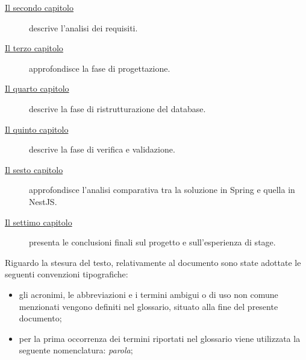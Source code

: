 \begin{description}
    \item[{\hyperref[cap:analisi-requisiti]{Il secondo capitolo}}] descrive l'analisi dei requisiti.
    
    \item[{\hyperref[cap:progettazione]{Il terzo capitolo}}] approfondisce la fase di progettazione.
    
    \item[{\hyperref[cap:ristrutturazione-database]{Il quarto capitolo}}] descrive la fase di ristrutturazione del database.
    
    \item[{\hyperref[cap:verifica-e-validazione]{Il quinto capitolo}}] descrive la fase di verifica e validazione.
    
    \item[{\hyperref[cap:analisi-comparativa]{Il sesto capitolo}}] approfondisce l'analisi comparativa tra la soluzione in Spring e quella in NestJS.
    
    \item[{\hyperref[cap:conclusioni]{Il settimo capitolo}}] presenta le conclusioni finali sul progetto e sull'esperienza di stage.
\end{description}

Riguardo la stesura del testo, relativamente al documento sono state adottate le seguenti convenzioni tipografiche:
\begin{itemize}
	\item gli acronimi, le abbreviazioni e i termini ambigui o di uso non comune menzionati vengono definiti nel glossario, situato alla fine del presente documento;
	\item per la prima occorrenza dei termini riportati nel glossario viene utilizzata la seguente nomenclatura: \emph{parola}\glsfirstoccur;
\end{itemize}